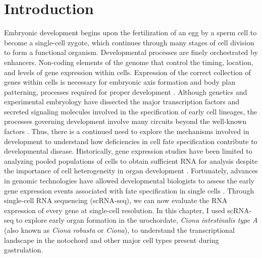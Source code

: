 \section{Introduction}

Embryonic development begins upon the fertilization of an egg by a sperm cell to become a single-cell zygote, which continues through many stages of cell division to form a functional organism. Developmental processes are finely orchestrated by enhancers. Non-coding elements of the genome that control the timing, location, and levels of gene expression within cells. Expression of the correct collection of genes within cells is necessary for embryonic axis formation and body plan patterning, processes required for proper development \cite{levine2010,xie2013,kvon2021,romanoski2015,olson2006,davidson2008,levine2005,imai2006}. Although genetics and experimental embryology have dissected the major transcription factors and secreted signaling molecules involved in the specification of early cell lineages, the processes governing development involve many circuits beyond the well-known factors \cite{romanoski2015,olson2006,davidson2008,levine2005,imai2004,imai2006}. Thus, there is a continued need to explore the mechanisms involved in development to understand how deficiencies in cell fate specification contribute to developmental disease. Historically, gene expression studies have been limited to analyzing pooled populations of cells to obtain sufficient RNA for analysis despite the importance of cell heterogeneity in organ development \cite{romanoski2015,wang2020,hong2020,li2021}. Fortunately, advances in genomic technologies have allowed developmental biologists to assess the early gene expression events associated with fate specification in single cells \cite{olsen2018,macosko2015,tang2009,jovic2022,papalexi2018}. Through single-cell RNA sequencing (scRNA-seq), we can now evaluate the RNA expression of every gene at single-cell resolution. In this chapter, I used scRNA-seq to explore early organ formation in the urochordate, \textit{Ciona intestinalis type A} (also known as \textit{Ciona robusta} or \textit{Ciona}), to understand the transcriptional landscape in the notochord and other major cell types present during gastrulation.


